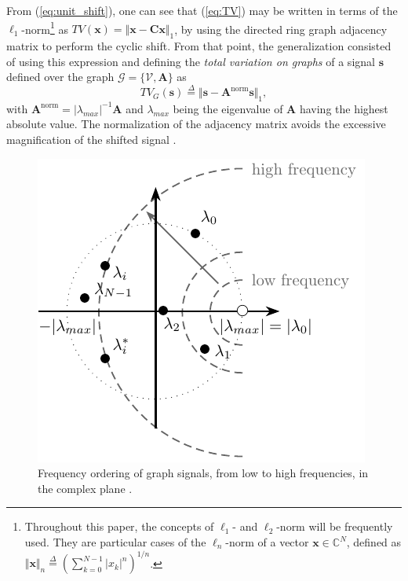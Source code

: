From (\ref{eq:unit_shift}), one can see that (\ref{eq:TV}) may be written in terms of the $ \ell_1 $-norm\footnote{Throughout this paper, the concepts of $ \ell_1 $- and $ \ell_2 $-norm will be frequently used. They are particular cases of the $ \ell_n $-norm of a vector $ \mathbf{x} \in \mathbb{C}^{N} $, defined as $ \Vert \mathbf{x}\Vert_n \overset{\Delta}{=} \left(\sum_{k=0}^{N-1} |x_k|^n\right)^{1/n} $.}
as $ TV(\mathbf{x}) = \Vert \mathbf{x} - \mathbf{C x}\Vert_1 $, by using the directed ring graph adjacency matrix to perform the cyclic shift. From that point, the generalization consisted of using this expression and defining the \emph{total variation on graphs} of a signal $ \mathbf{s} $ defined over the graph $ \mathcal{G} = \{\mathcal{V}, \mathbf{A}\} $ as
\begin{equation}
\label{eq:tv_graphs}
TV_G(\mathbf{s}) \overset{\Delta}{=} \Vert \mathbf{s} - \mathbf{A}^{\text{norm}} \mathbf{s}\Vert_1,
\end{equation}
with $ \mathbf{A}^{\text{norm}} = |\lambda_{max}|^{-1}\mathbf{A} $ and $ \lambda_{max} $ being the eigenvalue of $ \mathbf{A} $ having the highest absolute value. The normalization of the adjacency matrix avoids the excessive magnification of the shifted signal \cite{sandryhaila2014frequency}.

\begin{figure}
	\centering
	\includegraphics[width=0.35\linewidth]{Figures/graph_frequency_EN.pdf}
	\caption{Frequency ordering of graph signals, from low to high frequencies, in the complex plane \cite{sandryhaila2014frequency}.}
	\label{fig:ordem_freq}
\end{figure}

